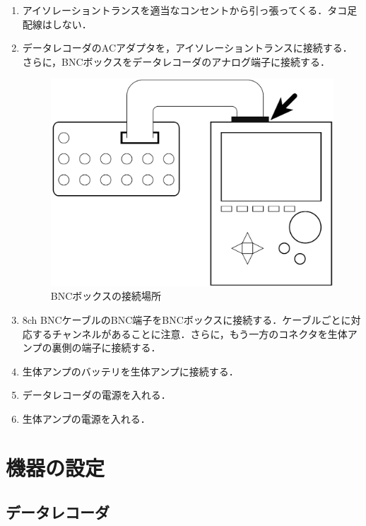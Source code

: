 \documentclass[a4j, twocolumn, openleft, uplatex, dvipdfmx]{jsbook}
\begin{document}
            \begin{enumerate}
                \item アイソレーショントランスを適当なコンセントから引っ張ってくる．タコ足配線はしない．
                \item データレコーダのACアダプタを，アイソレーショントランスに接続する．さらに，BNCボックスをデータレコーダのアナログ端子に接続する．
                \begin{figure}[H]
                    \centering
                    \includegraphics[width=\linewidth]{./figure/bnctonf.pdf}
                    \caption{BNCボックスの接続場所}
                \end{figure}
                \item 8ch BNCケーブルのBNC端子をBNCボックスに接続する．ケーブルごとに対応するチャンネルがあることに注意．さらに，もう一方のコネクタを生体アンプの裏側の端子に接続する．
                \item 生体アンプのバッテリを生体アンプに接続する．
                \item データレコーダの電源を入れる．
                \item 生体アンプの電源を入れる．
            \end{enumerate}

        \section{機器の設定}
        \label{sec:機器の設定}

            \subsection{データレコーダ}
            \label{sub:データレコーダ}
\end{document}
